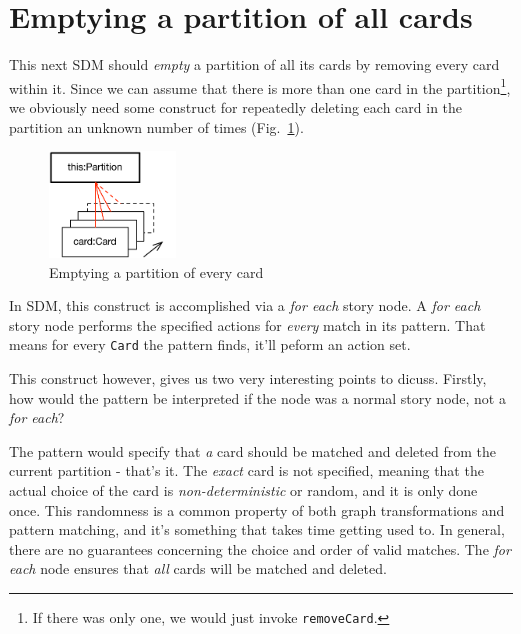 \newpage
\section{Emptying a partition of all cards}
\genHeader
\hypertarget{sec:emptyPartition}{}

This next SDM should \emph{empty} a partition of all its cards by removing every card within it. Since we can assume that there is more than one card in the
partition\footnote{If there was only one, we would just invoke \texttt{removeCard}.}, we obviously need some construct for repeatedly deleting each card in the
partition an unknown number of times (Fig.~\ref{fig:goal_empty}). 

\vspace{0.5cm}

\begin{figure}[htbp]
	\centering
  \includegraphics[width=0.3\textwidth]{goal_partitionEmpty.pdf}
	\caption{Emptying a partition of every card}
	\label{fig:goal_empty}
\end{figure}
\FloatBarrier

\vspace{0.5cm}

In SDM, this  construct is accomplished via a \emph{for each} story node. A
\emph{for each} story node performs the specified actions for \emph{every} match in its pattern. That means for every \texttt{Card} the pattern finds, it'll
peform an action set.

This construct however, gives us two very interesting points to dicuss. Firstly, how would the pattern be interpreted if the node was a normal story node, not a
\emph{for each}?

The pattern would specify that \emph{a} card should be matched and deleted from the current partition - that's it. The \emph{exact} card is not specified,
meaning that the actual choice of the card is \emph{non-deterministic} or random, and it is only done once. This randomness is a common property of both graph
transformations and pattern matching, and it's something that takes time getting used to.  In general, there are no guarantees concerning the choice and
order of valid matches. The \emph{for each} node ensures that \emph{all} cards will be matched and deleted.

